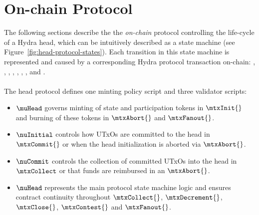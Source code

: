 \clearpage
\section{On-chain Protocol}\label{sec:on-chain}


\noindent The following sections describe the the \emph{on-chain} protocol controlling the
life-cycle of a Hydra head, which can be intuitively described as a state
machine (see Figure~\ref{fig:head-protocol-states}). Each transition in this state
machine is represented and caused by a corresponding Hydra protocol transaction
on-chain: \mtxInit{}, \mtxCom{}, \mtxAbort{}, \mtxCollect{}, \mtxDecrement{},
\red{\mtxIncrement{},} \mtxClose{}, \mtxContest{}, and \mtxFanout{}. \\

\noindent {} \\


\noindent The head protocol defines one minting policy script and three
validator scripts:
\begin{itemize}
	\item $\muHead$ governs minting of state and participation tokens in
	      $\mtxInit{}$ and burning of these tokens in $\mtxAbort{}$ and
	      $\mtxFanout{}$.
	\item $\nuInitial$ controls how UTxOs are committed to the head in
	      $\mtxCommit{}$ or when the head initialization is aborted via
	      $\mtxAbort{}$.
	\item $\nuCommit$ controls the collection of committed UTxOs into the head in
	      $\mtxCollect$ or that funds are reimbursed in an $\mtxAbort{}$.
	\item $\nuHead$ represents the main protocol state machine logic and ensures
				contract continuity throughout $\mtxCollect{}$, $\mtxDecrement{}$,
				\red{\mtxIncrement{},} $\mtxClose{}$, $\mtxContest{}$ and
				$\mtxFanout{}$.
\end{itemize}

